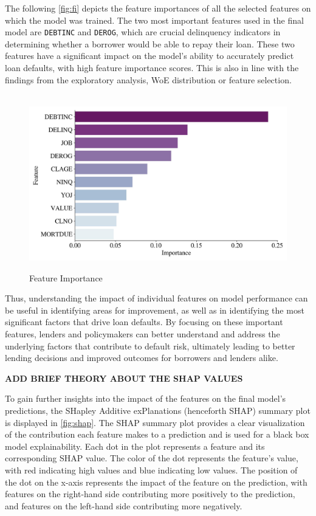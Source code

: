 The following \autoref{fig:fi} depicts the feature importances of all the selected features on which the model was trained.
The two most important features used in the final model are \texttt{DEBTINC} and \texttt{DEROG}, which are crucial delinquency indicators in determining whether a borrower would be able to repay their loan. These two features have a significant impact on the model's ability to accurately predict loan defaults, with high feature importance scores. This is also in line with the findings from the exploratory analysis, WoE distribution or feature selection.
\begin{figure}[H]
\centering
\caption{Feature Importance}\vspace{0.5em}
\label{fig:fi}\
\includegraphics[width=140mm]{Figures/Feature_Importances.jpg}
\vspace{-1em}
\end{figure}

Thus, understanding the impact of individual features on model performance can be useful in identifying areas for improvement, as well as in identifying the most significant factors that drive loan defaults.
By focusing on these important features, lenders and policymakers can better understand and address the underlying factors that contribute to default risk, ultimately leading to better lending decisions and improved outcomes for borrowers and lenders alike.

\textbf{ADD BRIEF THEORY ABOUT THE SHAP VALUES}

To gain further insights into the impact of the features on the final model's predictions, the SHapley Additive exPlanations (henceforth SHAP) summary plot is displayed in \autoref{fig:shap}.
The SHAP summary plot provides a clear visualization of the contribution each feature makes to a prediction and is used for a black box model explainability.
Each dot in the plot represents a feature and its corresponding SHAP value.
The color of the dot represents the feature's value, with red indicating high values and blue indicating low values.
The position of the dot on the x-axis represents the impact of the feature on the prediction, with features on the right-hand side contributing more positively to the prediction, and features on the left-hand side contributing more negatively.

